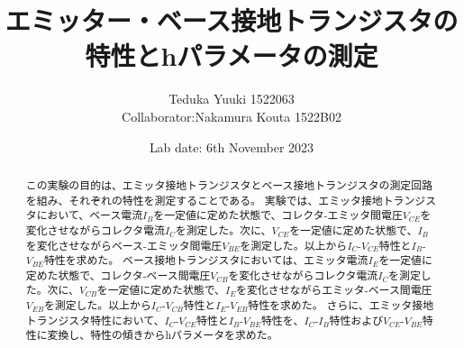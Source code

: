 \documentclass[a4paper,10pt]{jsarticle}
\begin{document}
\title{エミッター・ベース接地トランジスタの特性とhパラメータの測定}
\author{Teduka Yuuki 1522063 
\\
Collaborator:Nakamura Kouta 1522B02 }
\date{Lab date: 6th November 2023}
\maketitle

\begin{abstract}
 この実験の目的は、エミッタ接地トランジスタとベース接地トランジスタの測定回路を組み、それぞれの特性を測定することである。
 実験では、エミッタ接地トランジスタにおいて、ベース電流$I_B$を一定値に定めた状態で、コレクタ-エミッタ間電圧$V_{CE}$を変化させながらコレクタ電流$I_C$を測定した。次に、$V_{CE}$を一定値に定めた状態で、$I_B$を変化させながらベース-エミッタ間電圧$V_{BE}$を測定した。以上から$I_C$-$V_{CE}$特性と$I_B$-$V_{BE}$特性を求めた。
 ベース接地トランジスタにおいては、エミッタ電流$I_E$を一定値に定めた状態で、コレクタ-ベース間電圧$V_{CB}$を変化させながらコレクタ電流$I_C$を測定した。次に、$V_{CB}$を一定値に定めた状態で、$I_E$を変化させながらエミッタ-ベース間電圧$V_{EB}$を測定した。以上から$I_C$-$V_{CB}$特性と$I_E$-$V_{EB}$特性を求めた。
 さらに、エミッタ接地トランジスタ特性において、$I_C$-$V_{CE}$特性と$I_B$-$V_{BE}$特性を、$I_C$-$I_B$特性および$V_{CE}$-$V_{BE}$特性に変換し、特性の傾きからhパラメータを求めた。
\end{abstract}
\end{document}
